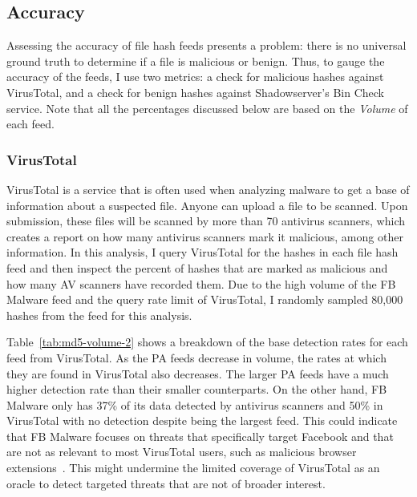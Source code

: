 \subsection{Accuracy}
\label{sec:hash-accuracy}
Assessing the accuracy of file hash feeds presents a problem: there is no
universal ground truth to determine if a file is malicious or benign. Thus,
to gauge the accuracy of the feeds, I use two metrics: a check for malicious
hashes against VirusTotal, and a check for benign hashes against Shadowserver's
Bin Check service. Note that all the percentages discussed below are based on
the \textit{Volume} of each feed.

\subsubsection{VirusTotal}

VirusTotal is a service that is often used when analyzing
malware to get a base of information about a suspected file.
Anyone can upload a file to be scanned. Upon submission, these files will be
scanned by more than 70 antivirus scanners, which creates a report on how many
antivirus scanners mark it malicious, among other information. In this analysis,
I query VirusTotal for the hashes in each file hash feed and then inspect the
percent of hashes that are marked as malicious and how many AV scanners have
recorded them. Due to the high volume of the FB Malware feed and the query
rate limit of VirusTotal, I randomly sampled 80,000 hashes from the feed for
this analysis.

Table~\ref{tab:md5-volume-2} shows a breakdown of the base detection rates 
for
each feed from VirusTotal. As the PA feeds decrease in volume, the rates at
which they are found in VirusTotal also decreases. The larger PA feeds have a
much higher detection rate than their smaller counterparts. On the other hand,
FB Malware only has 37\% of its data detected by antivirus scanners and 50\% in
VirusTotal with no detection despite being the largest feed. This could indicate
that FB Malware focuses on threats that specifically target Facebook and that
are not as relevant to most VirusTotal users, such as malicious browser
extensions~\cite{dekoven2017malicious, jagpal2015trends, kapravelos2014hulk}.
This might undermine the limited coverage of VirusTotal as an oracle to detect
targeted threats that are not of broader interest.

